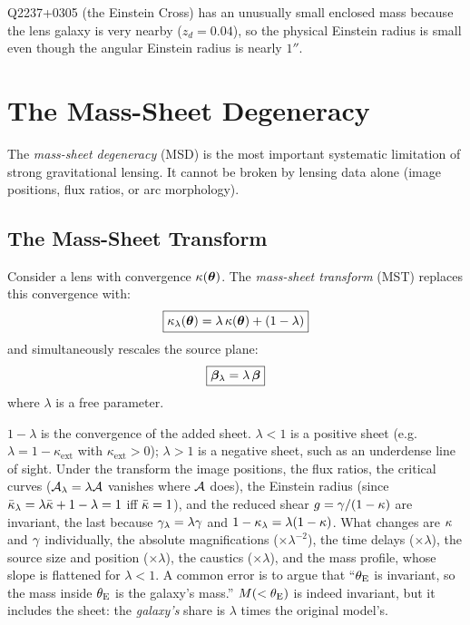 \begin{remark}
Q2237+0305 (the Einstein Cross) has an unusually small enclosed
mass because the lens galaxy is very nearby ($z_d = 0.04$), so the
physical Einstein radius is small even though the angular Einstein
radius is nearly $1''$.
\end{remark}


\section{The Mass-Sheet Degeneracy}
\label{sec:msd}

The \emph{mass-sheet degeneracy} (MSD) is the most important
systematic limitation of strong gravitational lensing.  It cannot be
broken by lensing data alone (image positions, flux ratios, or arc
morphology).

\subsection{The Mass-Sheet Transform}

Consider a lens with convergence $\kappa(\boldsymbol{\theta})$.  The
\emph{mass-sheet transform} (MST) replaces this convergence with:
\begin{equation}
    \boxed{
    \kappa_\lambda(\boldsymbol{\theta}) = \lambda\,\kappa(\boldsymbol{\theta})
    + (1 - \lambda)
    }
    \label{eq:mst_kappa}
\end{equation}
and simultaneously rescales the source plane:
\begin{equation}
    \boxed{
    \boldsymbol{\beta}_\lambda = \lambda\,\boldsymbol{\beta}
    }
    \label{eq:mst_beta}
\end{equation}
where $\lambda$ is a free parameter.

\begin{annotation}
$1-\lambda$ is the convergence of the added sheet.  $\lambda < 1$ is a positive
sheet (e.g.\ $\lambda = 1-\kappa_{\mathrm{ext}}$ with $\kappa_{\mathrm{ext}} > 0$);
$\lambda > 1$ is a negative sheet, such as an underdense line of sight.
Under the transform the image positions, the flux ratios, the critical
curves ($\mathcal{A}_\lambda = \lambda\mathcal{A}$ vanishes where $\mathcal{A}$ does), the
Einstein radius (since $\bar{\kappa}_\lambda = \lambda\bar{\kappa} + 1 - \lambda = 1$
iff $\bar{\kappa} = 1$), and the reduced shear $g = \gamma/(1-\kappa)$ are
invariant, the last because $\gamma_\lambda = \lambda\gamma$ and
$1-\kappa_\lambda = \lambda(1-\kappa)$.  What changes are $\kappa$ and
$\gamma$ individually, the absolute magnifications ($\times\lambda^{-2}$),
the time delays ($\times\lambda$), the source size and position
($\times\lambda$), the caustics ($\times\lambda$), and the mass profile,
whose slope is flattened for $\lambda < 1$.  A common error is to argue
that ``$\theta_{\mathrm{E}}$ is invariant, so the mass inside $\theta_{\mathrm{E}}$ is the galaxy's
mass.''  $M(<\theta_{\mathrm{E}})$ is indeed invariant, but it includes the sheet:
the \emph{galaxy's} share is $\lambda$ times the original model's.
\end{annotation}


